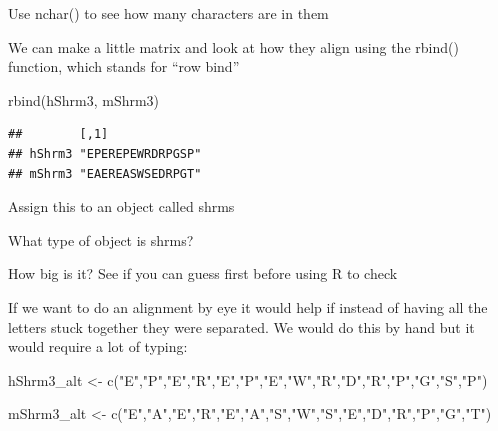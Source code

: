 \documentclass[
]{book}
\newenvironment{Shaded}{\begin{snugshade}}{\end{snugshade}}
\newcommand{\FunctionTok}[1]{\textcolor[rgb]{0.00,0.00,0.00}{#1}}
\newcommand{\NormalTok}[1]{#1}
\newcommand{\OtherTok}[1]{\textcolor[rgb]{0.56,0.35,0.01}{#1}}
\newcommand{\StringTok}[1]{\textcolor[rgb]{0.31,0.60,0.02}{#1}}
\begin{document}
Use nchar() to see how many characters are in them

We can make a little matrix and look at how they align using the rbind() function, which stands for ``row bind''

\begin{Shaded}
\begin{Highlighting}[]
\FunctionTok{rbind}\NormalTok{(hShrm3,}
\NormalTok{      mShrm3)}
\end{Highlighting}
\end{Shaded}

\begin{verbatim}
##        [,1]             
## hShrm3 "EPEREPEWRDRPGSP"
## mShrm3 "EAEREASWSEDRPGT"
\end{verbatim}

Assign this to an object called shrms

What type of object is shrms?

How big is it? See if you can guess first before using R to check

If we want to do an alignment by eye it would help if instead of having all the letters stuck together they were separated. We would do this by hand but it would require a lot of typing:

\begin{Shaded}
\begin{Highlighting}[]
\NormalTok{hShrm3\_alt  }\OtherTok{\textless{}{-}} \FunctionTok{c}\NormalTok{(}\StringTok{"E"}\NormalTok{,}\StringTok{"P"}\NormalTok{,}\StringTok{"E"}\NormalTok{,}\StringTok{"R"}\NormalTok{,}\StringTok{"E"}\NormalTok{,}\StringTok{"P"}\NormalTok{,}\StringTok{"E"}\NormalTok{,}\StringTok{"W"}\NormalTok{,}\StringTok{"R"}\NormalTok{,}\StringTok{"D"}\NormalTok{,}\StringTok{"R"}\NormalTok{,}\StringTok{"P"}\NormalTok{,}\StringTok{"G"}\NormalTok{,}\StringTok{"S"}\NormalTok{,}\StringTok{"P"}\NormalTok{)}

\NormalTok{mShrm3\_alt     }\OtherTok{\textless{}{-}} \FunctionTok{c}\NormalTok{(}\StringTok{"E"}\NormalTok{,}\StringTok{"A"}\NormalTok{,}\StringTok{"E"}\NormalTok{,}\StringTok{"R"}\NormalTok{,}\StringTok{"E"}\NormalTok{,}\StringTok{"A"}\NormalTok{,}\StringTok{"S"}\NormalTok{,}\StringTok{"W"}\NormalTok{,}\StringTok{"S"}\NormalTok{,}\StringTok{"E"}\NormalTok{,}\StringTok{"D"}\NormalTok{,}\StringTok{"R"}\NormalTok{,}\StringTok{"P"}\NormalTok{,}\StringTok{"G"}\NormalTok{,}\StringTok{"T"}\NormalTok{)}
\end{Highlighting}
\end{Shaded}
\end{document}
